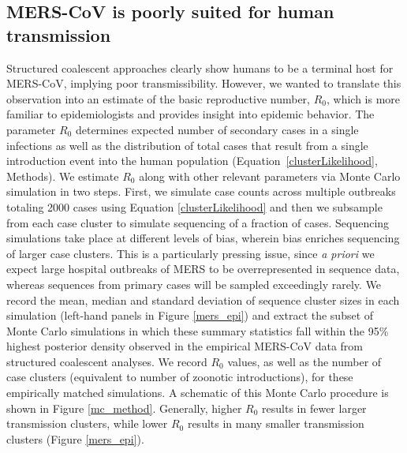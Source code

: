 \documentclass[11pt,oneside,letterpaper]{article}
\begin{document}
\subsection*{MERS-CoV is poorly suited for human transmission}

Structured coalescent approaches clearly show humans to be a terminal host for MERS-CoV, implying poor transmissibility.
However, we wanted to translate this observation into an estimate of the basic reproductive number, $R_{0}$, which is more familiar to epidemiologists and provides insight into epidemic behavior.
The parameter $R_{0}$ determines expected number of secondary cases in a single infections as well as the distribution of total cases that result from a single introduction event into the human population (Equation~\ref{clusterLikelihood}, Methods).
We estimate $R_{0}$ along with other relevant parameters via Monte Carlo simulation in two steps.
First, we simulate case counts across multiple outbreaks totaling 2000 cases using Equation \ref{clusterLikelihood} and then we subsample from each case cluster to simulate sequencing of a fraction of cases.
Sequencing simulations take place at different levels of bias, wherein bias enriches sequencing of larger case clusters.
This is a particularly pressing issue, since \textit{a priori} we expect large hospital outbreaks of MERS to be overrepresented in sequence data, whereas sequences from primary cases will be sampled exceedingly rarely.
We record the mean, median and standard deviation of sequence cluster sizes in each simulation (left-hand panels in Figure \ref{mers_epi}) and extract the subset of Monte Carlo simulations in which these summary statistics fall within the 95\% highest posterior density observed in the empirical MERS-CoV data from structured coalescent analyses.
We record $R_{0}$ values, as well as the number of case clusters (equivalent to number of zoonotic introductions), for these empirically matched simulations.
A schematic of this Monte Carlo procedure is shown in Figure \ref{mc_method}.
Generally, higher $R_0$ results in fewer larger transmission clusters, while lower $R_0$ results in many smaller transmission clusters (Figure \ref{mers_epi}).
\end{document}
